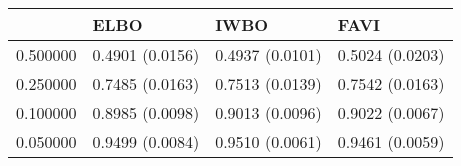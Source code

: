 \begin{tabular}{llll}
\toprule
 & ELBO & IWBO & FAVI \\
\midrule
0.500000 & 0.4901 (0.0156) & 0.4937 (0.0101) & 0.5024 (0.0203) \\
0.250000 & 0.7485 (0.0163) & 0.7513 (0.0139) & 0.7542 (0.0163) \\
0.100000 & 0.8985 (0.0098) & 0.9013 (0.0096) & 0.9022 (0.0067) \\
0.050000 & 0.9499 (0.0084) & 0.9510 (0.0061) & 0.9461 (0.0059) \\
\bottomrule
\end{tabular}
